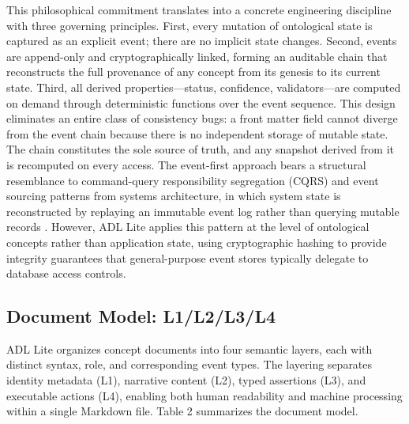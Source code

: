 This philosophical commitment translates into a concrete engineering discipline with three governing principles. First, every mutation of ontological state is captured as an explicit event; there are no implicit state changes. Second, events are append-only and cryptographically linked, forming an auditable chain that reconstructs the full provenance of any concept from its genesis to its current state. Third, all derived properties---status, confidence, validators---are computed on demand through deterministic functions over the event sequence. This design eliminates an entire class of consistency bugs: a front matter field cannot diverge from the event chain because there is no independent storage of mutable state. The chain constitutes the sole source of truth, and any snapshot derived from it is recomputed on every access. The event-first approach bears a structural resemblance to command-query responsibility segregation (CQRS) and event sourcing patterns from systems architecture, in which system state is reconstructed by replaying an immutable event log rather than querying mutable records \cite{ref19}\cite{ref20}. However, ADL Lite applies this pattern at the level of ontological concepts rather than application state, using cryptographic hashing to provide integrity guarantees that general-purpose event stores typically delegate to database access controls.

\subsection{Document Model: L1/L2/L3/L4}\label{document-model-l1l2l3l4}

ADL Lite organizes concept documents into four semantic layers, each with distinct syntax, role, and corresponding event types. The layering separates identity metadata (L1), narrative content (L2), typed assertions (L3), and executable actions (L4), enabling both human readability and machine processing within a single Markdown file. Table 2 summarizes the document model.

